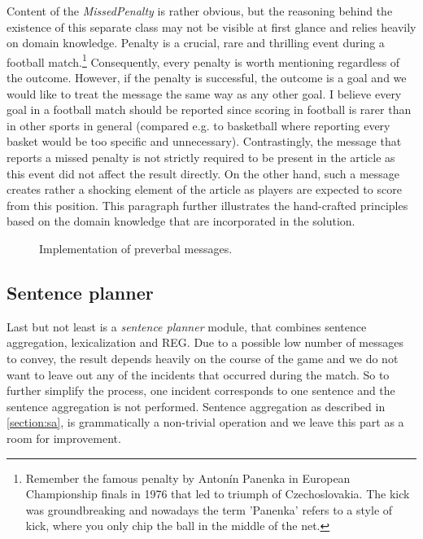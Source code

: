 Content of the \textit{MissedPenalty} is rather obvious, but the reasoning behind the existence of this separate class may not be visible at first glance and relies heavily on domain knowledge. Penalty is a crucial, rare and thrilling event during a football match.\footnote{Remember the famous penalty by Antonín Panenka in European Championship finals in 1976 that led to triumph of Czechoslovakia. The kick was groundbreaking and nowadays the term 'Panenka' refers to a style of kick, where you only chip the ball in the middle of the net.} Consequently, every penalty is worth mentioning regardless of the outcome. However, if the penalty is successful, the outcome is a goal and we would like to treat the message the same way as any other goal. I believe every goal in a football match should be reported since scoring in football is rarer than in other sports in general (compared e.g. to basketball where reporting every basket would be too specific and unnecessary). Contrastingly, the message that reports a missed penalty is not strictly required to be present in the article as this event did not affect the result directly. On the other hand, such a message creates rather a shocking element of the article as players are expected to score from this position. This paragraph further illustrates the hand-crafted principles based on the domain knowledge that are incorporated in the solution.

\begin{figure}[h]
	\caption{Implementation of preverbal messages.}
	\label{fig:message}
\end{figure} 

\subsection{Sentence planner}
Last but not least is a \textit{sentence planner} module, that combines sentence aggregation, lexicalization and REG. Due to a possible low number of messages to convey, the result depends heavily on the course of the game and we do not want to leave out any of the incidents that occurred during the match. So to further simplify the process, one incident corresponds to one sentence and the sentence aggregation is not performed. Sentence aggregation as described in \ref{section:sa}, is grammatically a non-trivial operation and we leave this part as a room for improvement.

